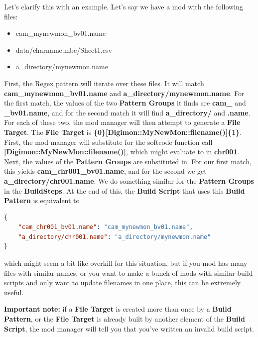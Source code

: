 \documentclass{article}
\begin{document}
Let's clarify this with an example. Let's say we have a mod with the following files:
\begin{itemize}
\item cam\_mynewmon\_bv01.name
\item data/charname.mbe/Sheet1.csv
\item a\_directory/mynewmon.name
\end{itemize}
First, the Regex pattern will iterate over these files. It will match \textbf{cam\_mynewmon\_bv01.name} and \textbf{a\_directory/mynewmon.name}. For the first match, the values of the two \textbf{Pattern Groups} it finds are \textbf{cam\_} and \textbf{\_bv01.name}, and for the second match it will find \textbf{a\_directory/} and \textbf{.name}. For each of these two, the mod manager will then attempt to generate a \textbf{File Target}. The \textbf{File Target} is \textbf{\{0\}[Digimon::MyNewMon::filename()]\{1\}}. First, the mod manager will substitute for the softcode function call \textbf{[Digimon::MyNewMon::filename()]}, which might evaluate to in \textbf{chr001}. Next, the values of the \textbf{Pattern Groups} are substituted in. For our first match, this yields \textbf{cam\_chr001\_bv01.name}, and for the second we get \textbf{a\_directory/chr001.name}. We do something similar for the \textbf{Pattern Groups} in the \textbf{BuildSteps}. At the end of this, the \textbf{Build Script} that uses this \textbf{Build Pattern} is equivalent to
\begin{lstlisting}[language=json,firstnumber=1]
{
    "cam_chr001_bv01.name": "cam_mynewmon_bv01.name",
    "a_directory/chr001.name": "a_directory/mynewmon.name"
}
\end{lstlisting}
which might seem a bit like overkill for this situation, but if you mod has many files with similar names, or you want to make a bunch of mods with similar build scripts and only want to update filenames in one place, this can be extremely useful.

\textbf{Important note:} if a \textbf{File Target} is created more than once by a \textbf{Build Pattern}, or the \textbf{File Target} is already built by another element of the \textbf{Build Script}, the mod manager will tell you that you've written an invalid build script.

\newpage
\end{document}

